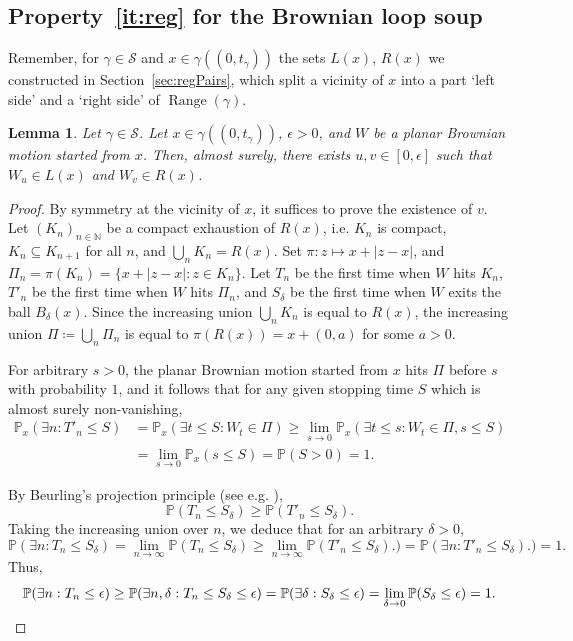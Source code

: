 \documentclass[11pt]{article}
\newtheorem{lemma}[theorem]{Lemma}
\DeclareMathOperator{\Range}{Range}
\begin{document}
\subsection{Property~\texorpdfstring{\eqref{it:reg}}{(v)} for the Brownian loop soup}
Remember, for $\gamma\in \mathscr{S}$ and $x\in \gamma((0,t_\gamma))$ the sets $L(x)$, $R(x)$ we constructed in Section~\ref{sec:regPairs}, which split a vicinity of $x$ into a part `left side' and a `right side' of $\Range(\gamma)$.
\begin{lemma}
    \label{le:tech:cas0}
    Let $\gamma\in \mathscr{S}$.
    Let $x\in \gamma((0,t_\gamma))$, $\epsilon>0$, and $W$ be a planar Brownian motion started from $x$. Then, almost surely, there exists  $u,v\in [0,\epsilon]$ such that $W_u\in L(x)$ and $W_v\in   R(x)$.
\end{lemma}
\begin{proof}
    By symmetry at the vicinity of $x$, it suffices to prove the existence of $v$.
    Let $(K_{n})_{n\in \mathbb{N}}$ be a compact exhaustion of $R(x)$, i.e. $K_{n}$ is compact, $K_{n}\subseteq K_{n+1}$ for all $n$, and $\bigcup_n K_{n}=R(x)$. Set
    $\pi:z\mapsto x+|z-x|$, and $\Pi_{n}=\pi(K_{n})=\{ x+|z-x|: z\in K_{n}\}  $.
    Let $T_{n}$ be the first time when $W$ hits $K_{n}$,
    $T'_{n}$ be the first time when $W$ hits $\Pi_{n}$,
    and $S_\delta$ be the first time when $W$ exits the ball $B_\delta(x)$. Since the increasing union
    $\bigcup_n  K_{n}$ is equal to $R(x)$, the increasing union $\Pi\coloneqq \bigcup_n  \Pi_{n}$ is equal to $\pi(R(x))=x+(0,a)$ for some $a>0$.

    For arbitrary $s>0$, the planar Brownian motion started from $x$ hits $\Pi$ before $s$ with probability $1$, and it follows that for any given stopping time $S$ which is almost surely non-vanishing,
    \begin{align*}
    \mathbb{P}_x( \exists n : T'_{n} \leq S)
    &= \mathbb{P}_x( \exists t \leq S: W_t\in \Pi)
    \geq \lim_{s\to 0}  \mathbb{P}_x( \exists t \leq s : W_t\in \Pi, s\leq S)\\
   & = \lim_{s\to 0}  \mathbb{P}_x( s\leq S)=\mathbb{P}(S>0)
    = 1.\end{align*}

    By Beurling's projection principle (see e.g. \cite[Eq. (2)]{Werner_Beurling}),
    \[
    \mathbb{P}(T_{n}\leq S_\delta)\geq  \mathbb{P}(T'_{n}\leq S_\delta).
    \]
    Taking the increasing union over $n$, we deduce that for an arbitrary $\delta>0$,
    \[
    \mathbb{P}( \exists n:  T_{n}\leq S_\delta)
    =\lim_{n \to \infty} \mathbb{P}(  T_{n}\leq S_\delta)
    \geq \lim_{n \to \infty}  \mathbb{P}( T'_{n}\leq S_\delta).  )
    =  \mathbb{P}( \exists n: T'_{n}\leq S_\delta).  )
    =1.
    \]
    Thus,
    \[
    \mathbb{P}( \exists n:  T_{n}\leq \epsilon )
    \geq
    \mathbb{P}( \exists n,\delta:  T_{n}\leq S_\delta \leq \epsilon )
    =
    \mathbb{P}( \exists \delta:  S_\delta \leq \epsilon )
    = \lim_{\delta\to 0}
    \mathbb{P}(   S_\delta \leq \epsilon )=1. \qedhere
    \]
\end{proof}
\end{document}
